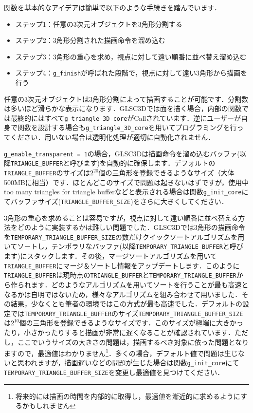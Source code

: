 \documentclass[platex,a4paper,12pt]{jsarticle}%
\begin{document}
関数を基本的なアイデアは簡単で以下のような手続きを踏んでいます．
\begin{itemize}
\item ステップ1：任意の3次元オブジェクトを3角形分割する
\item ステップ2：3角形分割された描画命令を溜め込む
\item ステップ3：3角形の重心を求め，視点に対して遠い順番に並べ替え溜め込む
\item ステップ4：\verb|g_finish|が呼ばれた段階で，視点に対して遠い3角形から描画を行う
\end{itemize}


任意の3次元オブジェクトは3角形分割によって描画することが可能です．分割数は多いほど滑らかな表示になります．GLSC3Dでは面を描く場合，内部の関数では最終的にはすべて\verb|g_triangle_3D_core|がCallされています．逆にユーザーが自身で関数を設計する場合も\verb|g_triangle_3D_core|を用いてプログラミングを行ってください．用いない場合は透明化処理が適切に自動化されません．


\verb|g_enable_transparent = 1|の場合，GLSC3Dは描画命令を溜め込むバッファ(以降\verb|TRIANGLE_BUFFER|と呼びます)を自動的に確保します．デフォルトの\verb|TRIANGLE_BUFFER|のサイズは$2^{20}$個の三角形を登録できるようなサイズ（大体500MBに相当）です．ほとんどこのサイズで問題は起きないはずですが，使用中too many triangles for triangle bufferなどと表示される場合は関数\verb|g_init_core|にてバッファサイズ(\verb|TRIANGLE_BUFFER_SIZE|)をさらに大きくしてください．


3角形の重心を求めることは容易ですが，視点に対して遠い順番に並べ替える方法をどのように実装するかは難しい問題でした．GLSC3Dでは3角形の描画命令を\verb|TEMPORARY_TRIANGLE_BUFFER_SIZE|の数だけクイックソートアルゴリズムを用いてソートし，テンポラリなバッファ(以降\verb|TEMPORARY_TRIANGLE_BUFFER|と呼びます)にスタックします．その後，マージソートアルゴリズムを用いて\verb|TRIANGLE_BUFFER|にマージ＆ソートし情報をアップデートします．このように\verb|TRIANGLE_BUFFER|は現時点の\verb|TRIANGLE_BUFFER|と\verb|TEMPORARY_TRIANGLE_BUFFER|から作られます．どのようなアルゴリズムを用いてソートを行うことが最も高速となるかは自明ではないため，様々なアルゴリズムを組み合わせて用いました．その結果，少なくとも筆者の環境ではこの方式が最も高速でした．デフォルトの設定では\verb|TEMPORARY_TRIANGLE_BUFFER|のサイズ\verb|TEMPORARY_TRIANGLE_BUFFER_SIZE|は$2^{10}$個の三角形を登録できるようなサイズです．このサイズが極端に大きかったり，小さかったりすると描画が非常に遅くなることが確認されています．ただし，ここでいうサイズの大きさの問題は，描画するべき対象に依った問題となりますので，最適値はわかりません\footnote{将来的には描画の時間を内部的に取得し，最適値を漸近的に求めるようにするかもしれません}．多くの場合，デフォルト値で問題は生じないと思われますが，描画遅いなどの問題が生じた場合は関数\verb|g_init_core|にて\verb|TEMPORARY_TRIANGLE_BUFFER_SIZE|を変更し最適値を見つけてください．
\end{document}
